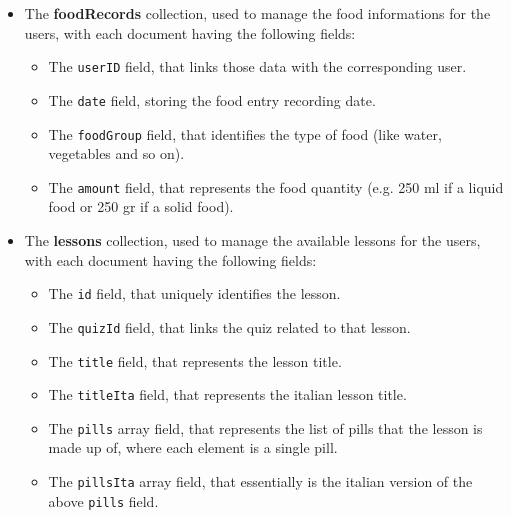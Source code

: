 \newpage
\begin{itemize}[nosep] %
    \item The \textbf{foodRecords} collection, used to manage the food informations for the users, with each document having the following fields:
    \begin{itemize}[nosep]
        \item The \texttt{userID} field, that links those data with the corresponding user.
        \item The \texttt{date} field, storing the food entry recording date.
        \item The \texttt{foodGroup} field, that identifies the type of food (like water, vegetables and so on).
        \item The \texttt{amount} field, that represents the food quantity (e.g. 250 ml if a liquid food or 250 gr if a solid food).
    \end{itemize}
\end{itemize}

\begin{itemize}[nosep] %
    \item The \textbf{lessons} collection, used to manage the available lessons for the users, with each document having the following fields:
    \begin{itemize}[nosep]
        \item The \texttt{id} field, that uniquely identifies the lesson.
        \item The \texttt{quizId} field, that links the quiz related to that lesson.
        \item The \texttt{title} field, that represents the lesson title.
        \item The \texttt{titleIta} field, that represents the italian lesson title.
        \item The \texttt{pills} array field, that represents the list of pills that the lesson is made up of, where each element is a single pill.
        \item The \texttt{pillsIta} array field, that essentially is the italian version of the above \texttt{pills} field.
    \end{itemize}
\end{itemize}

